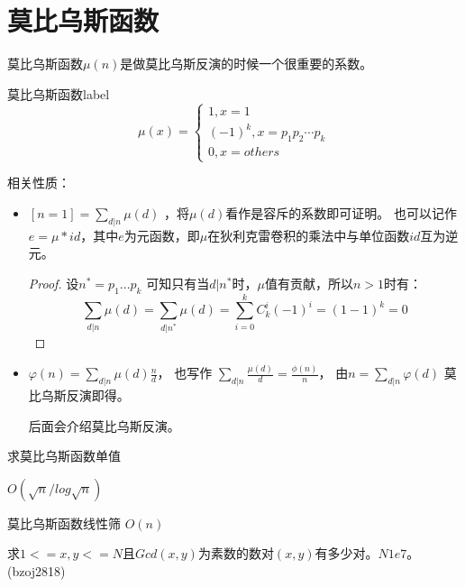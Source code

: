 

\section{莫比乌斯函数}
莫比乌斯函数$\mu(n)$是做莫比乌斯反演的时候一个很重要的系数。

\begin{definition}{莫比乌斯函数}{label}
$$
\mu(x)=\left\{\begin{array}{c}{1, x=1} \\ {(-1)^{k}, x=p_{1} p_{2} \cdots p_{k}} \\ {0, x=o t h e r s}\end{array}\right.
$$
\end{definition}

相关性质：
\begin{itemize}
\item $[n=1]=\sum_{d|n}{\mu(d)}$ ，将$\mu (d)$看作是容斥的系数即可证明。 也可以记作$e=\mu * id$，其中$e$为元函数，即$\mu$在狄利克雷卷积的乘法中与单位函数$id$互为逆元。 
\begin{proof}
设$n^*=p_1...p_k$  可知只有当$d|n^*$时，$\mu$值有贡献，所以$n>1$时有：       
$$
\sum_{d|n}\mu(d)=\sum_{d|n^*}\mu(d)=\sum_{i=0}^kC_k^i(-1)^i=(1-1)^k=0
$$
\end{proof}

\item $\varphi(n)=\sum_{d|n}{\mu(d)\frac{n}{d}}$， 也写作 $\sum_{d|n}{\frac{\mu(d)}{d}}=\frac{\phi(n)}{n}$， {\heiti 由$n=\sum_{d|n}{\varphi(d)}$ 莫比乌斯反演即得}。
\begin{note}
后面会介绍莫比乌斯反演。
\end{note}
\end{itemize}

\vbox{}

{\heiti 求莫比乌斯函数单值}

$O(\sqrt{n}/log\sqrt{n})$


\vbox{}

{\heiti 莫比乌斯函数线性筛}
$O(n)$


\vbox{}

\begin{example}
求$1<=x,y<=N$且$Gcd(x,y)$为素数的数对$(x,y)$有多少对。$N 1e7$。\quad (bzoj2818)
\end{example}

